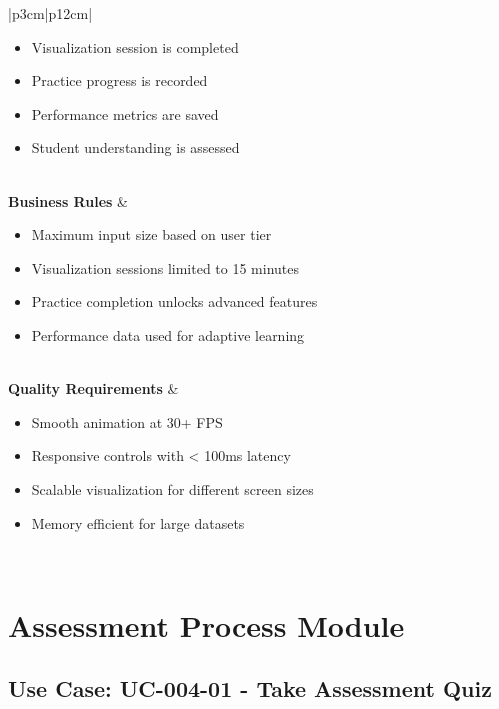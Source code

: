 \documentclass[12pt,a4paper]{article}
\begin{document}
\begin{longtable}{|p{3cm}|p{12cm}|}
\begin{minipage}[t]{\linewidth}
\begin{itemize}[leftmargin=*,noitemsep,topsep=0pt]
    \item Visualization session is completed
    \item Practice progress is recorded
    \item Performance metrics are saved
    \item Student understanding is assessed
\end{itemize}
\end{minipage} \\
\hline
\textbf{Business Rules} & 
\begin{minipage}[t]{\linewidth}
\begin{itemize}[leftmargin=*,noitemsep,topsep=0pt]
    \item Maximum input size based on user tier
    \item Visualization sessions limited to 15 minutes
    \item Practice completion unlocks advanced features
    \item Performance data used for adaptive learning
\end{itemize}
\end{minipage} \\
\hline
\textbf{Quality Requirements} & 
\begin{minipage}[t]{\linewidth}
\begin{itemize}[leftmargin=*,noitemsep,topsep=0pt]
    \item Smooth animation at 30+ FPS
    \item Responsive controls with < 100ms latency
    \item Scalable visualization for different screen sizes
    \item Memory efficient for large datasets
\end{itemize}
\end{minipage} \\
\hline
\end{longtable}

\section{Assessment Process Module}

\subsection{Use Case: UC-004-01 - Take Assessment Quiz}
\end{document}
